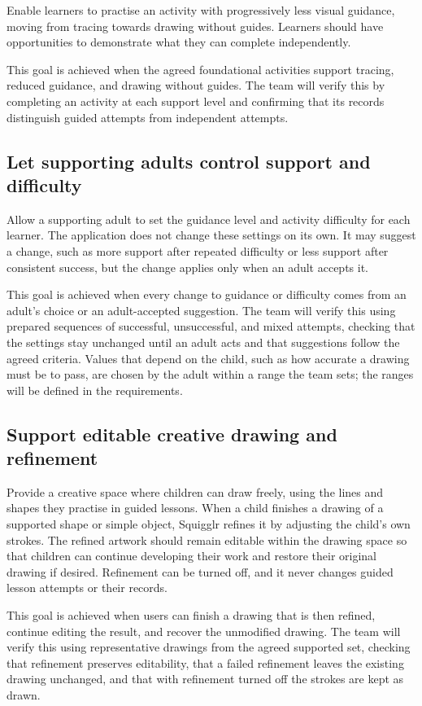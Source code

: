 \documentclass{article}
\begin{document}
Enable learners to practise an activity with progressively less visual
guidance, moving from tracing towards drawing without guides. Learners
should have opportunities to demonstrate what they can complete
independently.

This goal is achieved when the agreed foundational activities support
tracing, reduced guidance, and drawing without guides. The team will
verify this by completing an activity at each support level and
confirming that its records distinguish guided attempts from
independent attempts.

\subsection{Let supporting adults control support and difficulty}

Allow a supporting adult to set the guidance level and activity
difficulty for each learner. The application does not change these
settings on its own. It may suggest a change, such as more support
after repeated difficulty or less support after consistent success,
but the change applies only when an adult accepts it.

This goal is achieved when every change to guidance or difficulty
comes from an adult's choice or an adult-accepted suggestion. The team
will verify this using prepared sequences of successful, unsuccessful,
and mixed attempts, checking that the settings stay unchanged until an
adult acts and that suggestions follow the agreed criteria. Values that
depend on the child, such as how accurate a drawing must be to pass, are
chosen by the adult within a range the team sets; the ranges will be
defined in the requirements.


\subsection{Support editable creative drawing and refinement}

Provide a creative space where children can draw freely, using the
lines and shapes they practise in guided lessons. When a child finishes
a drawing of a supported shape or simple object, Squigglr refines it by
adjusting the child's own strokes. The refined artwork should remain
editable within the drawing space so that children can continue
developing their work and restore their original drawing if desired.
Refinement can be turned off, and it never changes guided lesson
attempts or their records.

This goal is achieved when users can finish a drawing that is then
refined, continue editing the result, and recover the unmodified
drawing. The team will verify this using representative drawings from
the agreed supported set, checking that refinement preserves
editability, that a failed refinement leaves the existing drawing
unchanged, and that with refinement turned off the strokes are kept as
drawn.
\end{document}
